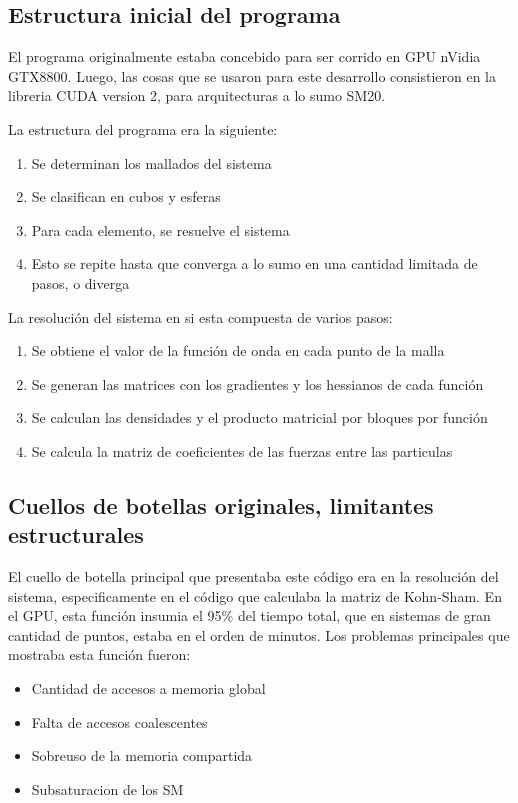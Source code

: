 \subsection{Estructura inicial del programa}

El programa originalmente estaba concebido para ser corrido en GPU nVidia GTX8800.
Luego, las cosas que se usaron para este desarrollo consistieron en la libreria CUDA version
2, para arquitecturas a lo sumo SM20.

La estructura del programa era la siguiente:
\begin{enumerate}
\item Se determinan los mallados del sistema
\item Se clasifican en cubos y esferas
\item Para cada elemento, se resuelve el sistema
\item Esto se repite hasta que converga a lo sumo en una cantidad limitada de pasos, o diverga
\end{enumerate}

La resoluci\'on del sistema en si esta compuesta de varios pasos:
\begin{enumerate}
\item Se obtiene el valor de la funci\'on de onda en cada punto de la malla
\item Se generan las matrices con los gradientes y los hessianos de cada funci\'on
\item Se calculan las densidades y el producto matricial por bloques por funci\'on
\item Se calcula la matriz de coeficientes de las fuerzas entre las particulas
\end{enumerate}


\subsection{Cuellos de botellas originales, limitantes estructurales}

El cuello de botella principal que presentaba este c\'odigo era en la
resoluci\'on del sistema, especificamente en el c\'odigo que calculaba la matriz de Kohn-Sham.
En el GPU, esta funci\'on insumia el 95\% del tiempo total, que en sistemas de gran cantidad
de puntos, estaba en el orden de minutos. Los problemas principales que mostraba esta funci\'on fueron:
\begin{itemize}
\item Cantidad de accesos a memoria global
\item Falta de accesos coalescentes
\item Sobreuso de la memoria compartida
\item Subsaturacion de los SM
\end{itemize}

